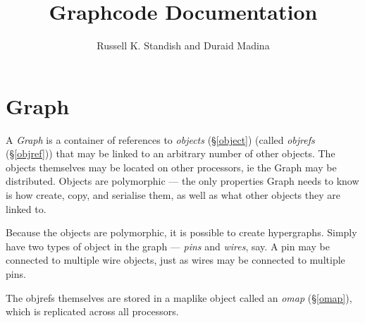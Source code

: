 
\newcommand{\htmladdnormallink}[2]{#1}
\newcommand{\htmladdnormallinkfoot}[2]{#1\footnote{#2}}
\newcommand{\hyperref}[4]{#1#2\ref{#4}#3}

\title{Graphcode Documentation}
\author{Russell K. Standish and Duraid Madina}

\newcommand{\EcoLab}{{\sffamily\slshape
    \mbox{\raisebox{.5ex}{Eco}\hspace{-.4em}{\makebox[.5em]{L}ab}}}}

\makeindex

\maketitle

\newcommand{\psection}[1]{\section{#1}}
\newcommand{\psubsection}[1]{\subsection{#1}}

\psection{Graph}

A {\em Graph} is a container of references to
\hyperref{{\em objects}}{ (\S}{)}{object}
(called \hyperref{{\em objrefs}}{
    (\S}{)}{objref}) that may be linked to an arbitrary
  number of other objects. The objects themselves may be located on
  other processors, ie the Graph may be distributed. Objects are
  polymorphic --- the only properties Graph needs to know is how
  create, copy, and serialise them, as well as what other objects they
  are linked to.

Because the objects are polymorphic, it is possible to create
hypergraphs. Simply have two types of object in the graph --- {\em
  pins} and {\em wires}, say. A pin may be connected to multiple wire
objects, just as wires may be connected to multiple pins.

The objrefs themselves are stored in a maplike object called an
\hyperref{{\em omap}}{ (\S}{)}{omap}, which is replicated
across all processors. 

